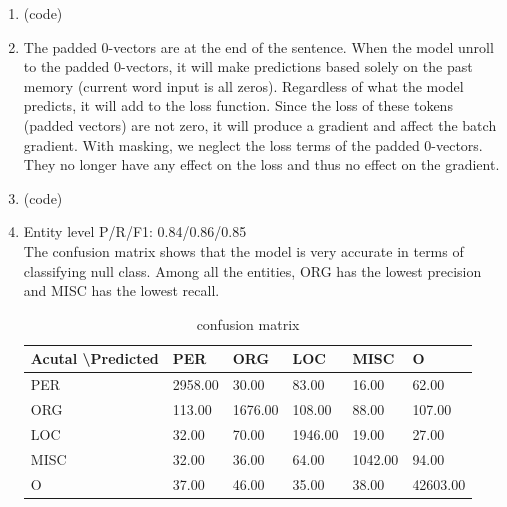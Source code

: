 \documentclass[10pt]{article}
\begin{document}
\begin{enumerate}[label=(\alph*)]
\item
(code)

\item
The padded 0-vectors are at the end of the sentence.
When the model unroll to the padded 0-vectors, it will make predictions based solely on the past memory (current word input is all zeros).
Regardless of what the model predicts, it will add to the loss function.
Since the loss of these tokens (padded vectors) are not zero, it will produce a gradient and affect the batch gradient.
With masking, we neglect the loss terms of the padded 0-vectors. They no longer have any effect on the loss and thus no effect on the gradient.\\

\item
(code)

\item
Entity level P/R/F1: 0.84/0.86/0.85\\
The confusion matrix shows that the model is very accurate in terms of classifying null class. Among all the entities,  ORG has the lowest precision and MISC has the lowest recall. 
\begin{table}[h]
	\centering
	\caption{confusion matrix}
	\begin{tabular}{|l|l|l|l|l|l|}
	\hline
	Acutal \textbackslash Predicted & PER     & ORG     & LOC     & MISC    & O        \\ \hline
	PER   & 2958.00 & 30.00   & 83.00   & 16.00   & 62.00    \\ \hline
	ORG   & 113.00  & 1676.00 & 108.00   & 88.00   & 107.00   \\ \hline
	LOC   & 32.00   & 70.00  & 1946.00 & 19.00   & 27.00    \\ \hline
	MISC  & 32.00   & 36.00   & 64.00   & 1042.00 & 94.00   \\ \hline
	O     & 37.00   & 46.00   & 35.00   & 38.00   & 42603.00 \\ \hline
	\end{tabular}
\end{table}


\end{enumerate}
\end{document}
